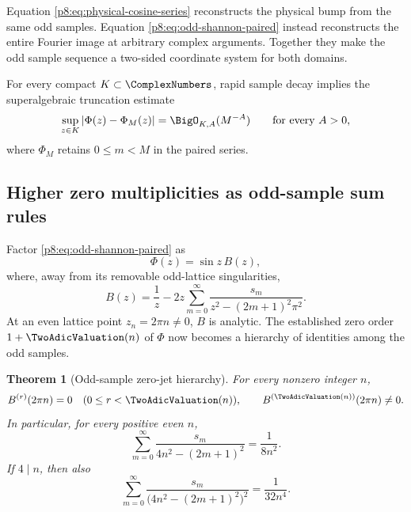 \documentclass[11pt]{article}
\newtheorem{theorem}{Theorem}[section]
\theoremstyle{definition}
\theoremstyle{remark}
\begin{document}
\newresult Equation \eqref{p8:eq:physical-cosine-series} reconstructs the
physical bump from the same odd samples.  Equation
\eqref{p8:eq:odd-shannon-paired} instead reconstructs the entire Fourier image
at arbitrary complex arguments.  Together they make the odd sample sequence
a two-sided coordinate system for both domains.

For every compact $K\subset\ComplexNumbers$, rapid sample decay implies the superalgebraic
truncation estimate
\begin{equation}
 \sup_{z\in K}|\Phi(z)-\Phi_M(z)|=\BigO_{K,A}(M^{-A})
 \qquad\text{for every }A>0,                             \label{p8:eq:shannon-superalgebraic}
\end{equation}
where $\Phi_M$ retains $0\le m<M$ in the paired series.

\subsection{Higher zero multiplicities as odd-sample sum rules}

Factor \eqref{p8:eq:odd-shannon-paired} as
\begin{equation}
 \Phi(z)=\sin z\,B(z),                                   \label{p8:eq:Phi-sin-B}
\end{equation}
where, away from its removable odd-lattice singularities,
\begin{equation}
 B(z)=\frac1z-2z\sum_{m=0}^\infty
 \frac{s_m}{z^2-(2m+1)^2\pi^2}.                          \label{p8:eq:B-definition}
\end{equation}
At an even lattice point $z_n=2\pi n\ne0$, $B$ is analytic.  The established
zero order $1+\TwoAdicValuation(n)$ of $\Phi$ now becomes a hierarchy of identities among
the odd samples.

\begin{theorem}[Odd-sample zero-jet hierarchy]
\label{p8:thm:sample-jet-hierarchy}
For every nonzero integer $n$,
\begin{equation}
 B^{(r)}(2\pi n)=0
 \quad(0\le r<\TwoAdicValuation(n)),
 \qquad
 B^{(\TwoAdicValuation(n))}(2\pi n)\ne0.                             \label{p8:eq:B-jet-hierarchy}
\end{equation}
In particular, for every positive even $n$,
\begin{equation}
 \boxed{\displaystyle
 \sum_{m=0}^\infty
 \frac{s_m}{4n^2-(2m+1)^2}=\frac1{8n^2}.}               \label{p8:eq:sample-sum-rule-1}
\end{equation}
If $4\mid n$, then also
\begin{equation}
 \boxed{\displaystyle
 \sum_{m=0}^\infty
 \frac{s_m}{\bigl(4n^2-(2m+1)^2\bigr)^2}
 =\frac1{32n^4}.}                                       \label{p8:eq:sample-sum-rule-2}
\end{equation}
\end{theorem}
\end{document}
